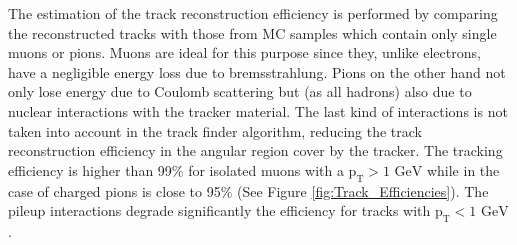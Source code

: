 The estimation of the track reconstruction efficiency is performed by comparing the reconstructed tracks with those from 
MC samples which contain only single muons or pions. Muons are ideal for this purpose since they, unlike electrons, 
have a negligible energy loss due to bremsstrahlung. Pions on the other hand not only lose energy due to 
Coulomb scattering but (as all hadrons) also due to nuclear interactions with the tracker material. The last kind of interactions
is not taken into account in the track finder algorithm, reducing the track reconstruction efficiency in the angular region cover by the 
tracker. The tracking efficiency is higher than 99$\%$ for isolated muons with a $\textrm{p}_{\textrm{T}}>1$ $\textrm{GeV}$ while in the
case of charged pions is close to 95$\%$ (See Figure \ref{fig:Track_Efficiencies}). The pileup interactions
degrade significantly the efficiency for tracks with $\textrm{p}_{\textrm{T}}<1$ $\textrm{GeV}$ \cite{Chatrchyan:2014fea}. 







